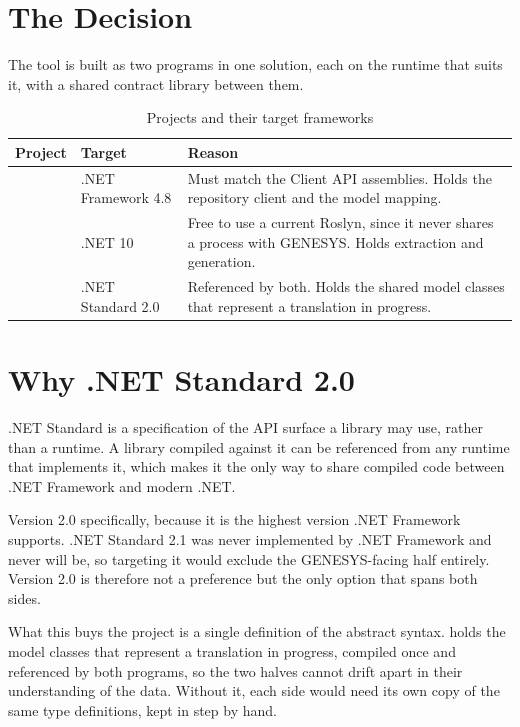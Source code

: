 \section{The Decision}

The tool is built as two programs in one solution, each on the runtime that suits
it, with a shared contract library between them.

\begin{table}[htbp]
	\centering
	\caption{Projects and their target frameworks}\label{tab:frameworks}
	\begin{tabular}{L{0.26\textwidth}L{0.18\textwidth}L{0.46\textwidth}}
\toprule
	\textbf{Project} & \textbf{Target} & \textbf{Reason} \\
	\midrule
{} & .NET Framework 4.8 & Must match the Client API
	assemblies. Holds the repository client and the model mapping. \\
	\addlinespace
	 & .NET 10 & Free to use a current Roslyn, since
	it never shares a process with GENESYS. Holds extraction and generation. \\
	\addlinespace
	 & .NET Standard 2.0 & Referenced by both. Holds the
	shared model classes that represent a translation in progress. \\
	\bottomrule
	\end{tabular}
\end{table}

\section{Why .NET Standard 2.0}

.NET Standard is a specification of the API surface a library may use, rather
than a runtime. A library compiled against it can be referenced from any runtime
that implements it, which makes it the only way to share compiled code between
.NET Framework and modern .NET.

Version 2.0 specifically, because it is the highest version .NET Framework
supports. .NET Standard 2.1 was never implemented by .NET Framework and never
will be, so targeting it would exclude the GENESYS-facing half entirely. Version
2.0 is therefore not a preference but the only option that spans both sides.

What this buys the project is a single definition of the abstract syntax.
 holds the model classes that represent a translation in
progress, compiled once and referenced by both programs, so the two halves cannot
drift apart in their understanding of the data. Without it, each side would need
its own copy of the same type definitions, kept in step by hand.

